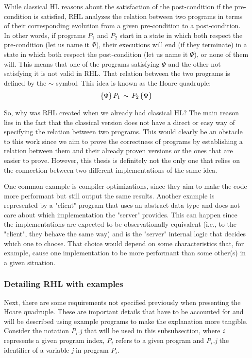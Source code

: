 While classical HL reasons about the satisfaction of the post-condition if the pre-condition is satisfied, RHL analyzes the relation between two programs in terms of their corresponding evolution from a given pre-condition to a post-condition.
In other words, if programs \emph{$P_1$} and \emph{$P_2$} start in a state in which both respect the pre-condition (let us name it $\Phi$), their executions will end (if they terminate) in a state in which both respect the post-condition (let us name it $\Psi$), or none of them will.
This means that one of the programs satisfying $\Psi$ and the other not satisfying it is not valid in RHL.
That relation between the two programs is defined by the $\sim$ symbol.
This idea is known as the Hoare quadruple:
\[ \{\Phi\} \, \emph{$P_1$} \, \sim \, \emph{$P_2$} \, \{\Psi\} \]

So, why was RHL created when we already had classical HL? 
The main reason lies in the fact that the classical version does not have a direct or easy way of specifying the relation between two programs. 
This would clearly be an obstacle to this work since we aim to prove the correctness of programs by establishing a relation between them and their already proven versions or the ones that are easier to prove.
However, this thesis is definitely not the only one that relies on the connection between two different implementations of the same idea.

One common example is compiler optimizations, since they aim to make the code more performant but still output the same results.
Another example is represented by a "client" program that uses an abstract data type and does not care about which implementation the "server" provides.
This can happen since the implementations are expected to be observationally equivalent (i.e., to the "client", they behave the same way) and is the "server" internal logic that decides which one to choose.
That choice would depend on some characteristics that, for example, cause one implementation to be more performant than some other(s) in a given situation.


\subsubsection{Detailing RHL with examples}
\label{sub:relational_hoare_logic_examples}

Next, there are some requirements not specified previously when presenting the Hoare quadruple.
These are important details that have to be accounted for and will be described using example programs to make the explanation more tangible.
Consider the notation \emph{P$_i$.j} that will be used in this subsubsection, where \emph{i} represents a given program index, \emph{P$_i$} refers to a given program and \emph{P$_i$.j} the identifier of a variable \emph{j} in program \emph{P$_i$}.

